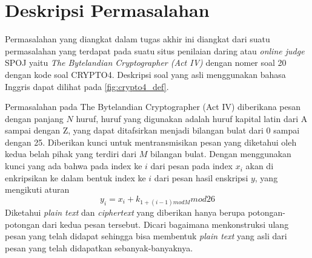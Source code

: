 	\section{Deskripsi Permasalahan}
	\label{chapter:dasar-teori}
	Permasalahan yang diangkat dalam tugas akhir ini diangkat dari suatu permasalahan yang terdapat pada suatu situs penilaian daring atau \textit{online judge} SPOJ yaitu \textit{The Bytelandian Cryptographer (Act IV)} dengan nomer soal 20 dengan kode soal CRYPTO4. Deskripsi soal yang asli menggunakan bahasa Inggris dapat dilihat pada \ref{fig:crypto4_def}.\cite{piwakowski_crypto4_2004}
	
	
	 Permasalahan pada The Bytelandian Cryptographer (Act IV) diberikana pesan dengan panjang $N$ huruf, huruf yang digunakan adalah huruf kapital latin dari A sampai dengan Z, yang dapat ditafsirkan menjadi bilangan bulat dari 0 sampai dengan 25. Diberikan kunci untuk mentransmisikan pesan yang diketahui oleh kedua belah pihak yang terdiri dari $M$ bilangan bulat. Dengan menggunakan kunci yang ada bahwa pada index ke $i$ dari pesan pada index $x_i$ akan di enkripsikan ke dalam bentuk index ke $i$ dari pesan hasil enskripsi $y$, yang mengikuti aturan
	\begin{equation}
	y_i=x_i+k_{1+(i-1)mod M} mod 26 
	\end{equation}		 
	 Diketahui \textit{plain text} dan \textit{ciphertext} yang diberikan hanya berupa potongan-potongan dari kedua pesan tersebut. Dicari bagaimana menkonstruksi ulang pesan yang telah didapat sehingga bisa membentuk \textit{plain text} yang asli dari pesan yang telah didapatkan sebanyak-banyaknya.
